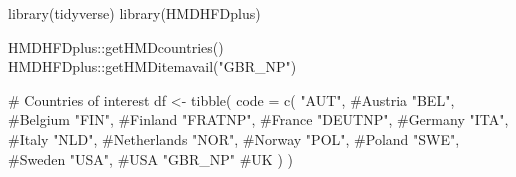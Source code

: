 \documentclass[
  letterpaper,
  DIV=11,
  numbers=noendperiod]{scrartcl}
\newenvironment{Shaded}{\begin{snugshade}}{\end{snugshade}}
\newcommand{\AttributeTok}[1]{\textcolor[rgb]{0.40,0.45,0.13}{#1}}
\newcommand{\CommentTok}[1]{\textcolor[rgb]{0.37,0.37,0.37}{#1}}
\newcommand{\FunctionTok}[1]{\textcolor[rgb]{0.28,0.35,0.67}{#1}}
\newcommand{\NormalTok}[1]{\textcolor[rgb]{0.00,0.23,0.31}{#1}}
\newcommand{\OtherTok}[1]{\textcolor[rgb]{0.00,0.23,0.31}{#1}}
\newcommand{\SpecialCharTok}[1]{\textcolor[rgb]{0.37,0.37,0.37}{#1}}
\newcommand{\StringTok}[1]{\textcolor[rgb]{0.13,0.47,0.30}{#1}}
\begin{document}
\begin{Shaded}
\begin{Highlighting}[]
\FunctionTok{library}\NormalTok{(tidyverse)}
\FunctionTok{library}\NormalTok{(HMDHFDplus)}

\NormalTok{HMDHFDplus}\SpecialCharTok{::}\FunctionTok{getHMDcountries}\NormalTok{()}
\NormalTok{HMDHFDplus}\SpecialCharTok{::}\FunctionTok{getHMDitemavail}\NormalTok{(}\StringTok{"GBR\_NP"}\NormalTok{)}

\CommentTok{\# Countries of interest }
\NormalTok{df }\OtherTok{\textless{}{-}} \FunctionTok{tibble}\NormalTok{(}
  \AttributeTok{code =} \FunctionTok{c}\NormalTok{(}
  \StringTok{"AUT"}\NormalTok{, }\CommentTok{\#Austria}
  \StringTok{"BEL"}\NormalTok{, }\CommentTok{\#Belgium}
  \StringTok{"FIN"}\NormalTok{, }\CommentTok{\#Finland}
  \StringTok{"FRATNP"}\NormalTok{, }\CommentTok{\#France}
  \StringTok{"DEUTNP"}\NormalTok{, }\CommentTok{\#Germany}
  \StringTok{"ITA"}\NormalTok{, }\CommentTok{\#Italy}
  \StringTok{"NLD"}\NormalTok{, }\CommentTok{\#Netherlands}
  \StringTok{"NOR"}\NormalTok{, }\CommentTok{\#Norway}
  \StringTok{"POL"}\NormalTok{, }\CommentTok{\#Poland}
  \StringTok{"SWE"}\NormalTok{, }\CommentTok{\#Sweden}
  \StringTok{"USA"}\NormalTok{, }\CommentTok{\#USA}
  \StringTok{"GBR\_NP"} \CommentTok{\#UK}
\NormalTok{  )}
\NormalTok{)}


\end{Highlighting}
\end{Shaded}
\end{document}
